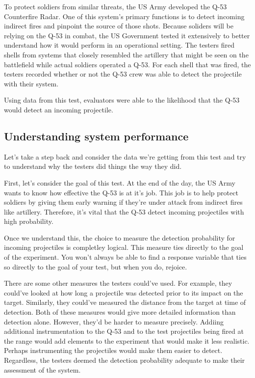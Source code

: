\documentclass[
]{book}
\theoremstyle{definition}
\theoremstyle{definition}
\theoremstyle{definition}
\theoremstyle{remark}
\begin{document}
To protect soldiers from similar threats, the US Army developed the Q-53 Counterfire Radar. One of this system's primary functions is to detect incoming indirect fires and pinpoint the source of those shots. Because soliders will be relying on the Q-53 in combat, the US Government tested it extensively to better understand how it would perform in an operational setting. The testers fired shells from systems that closely resembled the artillery that might be seen on the battlefield while actual soldiers operated a Q-53. For each shell that was fired, the testers recorded whether or not the Q-53 crew was able to detect the projectile with their system.

Using data from this test, evaluators were able to the likelihood that the Q-53 would detect an incoming projectile.

\hypertarget{understanding-system-performance}{%
\subsection{Understanding system performance}\label{understanding-system-performance}}

Let's take a step back and consider the data we're getting from this test and try to understand why the testers did things the way they did.

First, let's consider the goal of this test. At the end of the day, the US Army wants to know how effective the Q-53 is at it's job. This job is to help protect soldiers by giving them early warning if they're under attack from indirect fires like artillery. Therefore, it's vital that the Q-53 detect incoming projectiles with high probability.

Once we understand this, the choice to measure the detection probability for incoming projectiles is completley logical. This measure ties directly to the goal of the experiment. You won't always be able to find a response variable that ties so directly to the goal of your test, but when you do, rejoice.

There are some other measures the testers could've used. For example, they could've looked at how long a projectile was detected prior to its impact on the target. Similarly, they could've measured the distance from the target at time of detection. Both of these measures would give more detailed information than detection alone. However, they'd be harder to measure precisely. Addiing additional instrumentation to the Q-53 and to the test projectiles being fired at the range would add elements to the experiment that would make it less realistic. Perhaps instrumenting the projectiles would make them easier to detect. Regardless, the testers deemed the detection probability adequate to make their assessment of the system.
\end{document}
